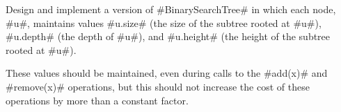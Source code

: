 \begin{exc}
  Design and implement a version of #BinarySearchTree# in which each node,
  #u#, maintains values #u.size# (the size of the subtree rooted at #u#),
  #u.depth# (the depth of #u#), and #u.height# (the height of the subtree
  rooted at #u#).  

  These values should be maintained, even during calls to the #add(x)#
  and #remove(x)# operations, but this should not increase the cost of
  these operations by more than a constant factor.
\end{exc}
